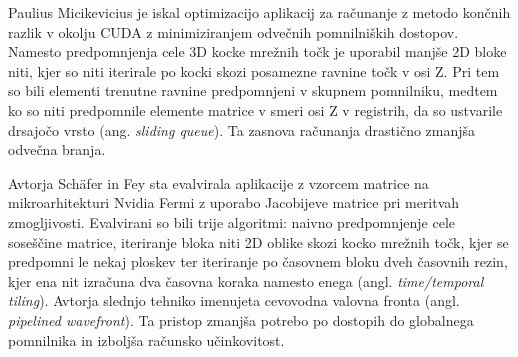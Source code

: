 \documentclass[a4paper, 12pt, openright]{book}
\begin{document}
Paulius Micikevicius \cite{10.1145/1513895.1513905} je iskal optimizacijo aplikacij za računanje z metodo končnih razlik v okolju CUDA z minimiziranjem odvečnih pomnilniških dostopov.
Namesto predpomnjenja cele 3D kocke mrežnih točk je uporabil manjše 2D bloke niti, kjer so niti iterirale po kocki skozi posamezne ravnine točk v osi Z.
Pri tem so bili elementi trenutne ravnine predpomnjeni v skupnem pomnilniku, medtem ko so niti predpomnile elemente matrice v smeri osi Z v registrih, da so ustvarile drsajočo vrsto (ang. \textit{sliding queue}).
Ta zasnova računanja drastično zmanjša odvečna branja.

Avtorja Sch\"afer in Fey \cite{SCHAFER20112027} sta evalvirala aplikacije z vzorcem matrice na mikroarhitekturi Nvidia Fermi z uporabo Jacobijeve matrice pri meritvah zmogljivosti.
Evalvirani so bili trije algoritmi: naivno predpomnjenje cele soseščine matrice, iteriranje bloka niti 2D oblike skozi kocko mrežnih točk, kjer se predpomni le nekaj ploskev ter iteriranje po časovnem bloku dveh časovnih rezin, kjer ena nit izračuna dva časovna koraka namesto enega (angl. \textit{time/temporal tiling}). Avtorja slednjo tehniko imenujeta cevovodna valovna fronta (angl. \textit{pipelined wavefront}).
Ta pristop zmanjša potrebo po dostopih do globalnega pomnilnika in izboljša računsko učinkovitost.

\end{document}

